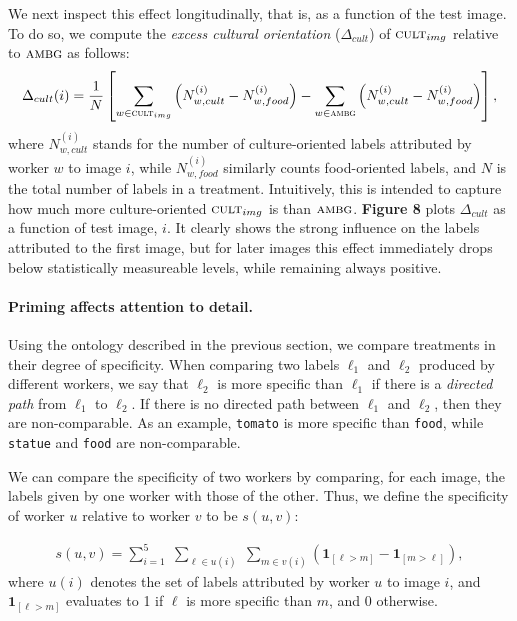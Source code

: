 \documentclass[a4paper]{report}
\begin{document}
We next inspect this effect longitudinally, that is, as a function of 
the test image.  To do so, we compute the \textit{excess cultural orientation} 
($\Delta_{cult}$) of
$\textsc{cult}_{img}$ relative to $\textsc{ambg}$ as follows: 
\begin{align}
	\Delta_{cult}(i) = \frac{1}{N}\left[ \sum_{w\in\textsc{cult}_{img}} \left(N_{w,cult}^{(i)} - N_{w,food}^{(i)}\right)
	- \sum_{w\in\textsc{ambg}} \left(N_{w,cult}^{(i)} - N_{w,food}^{(i)}\right)\right],
\end{align}
where $N_{w,cult}^{(i)}$ stands for the number of culture-oriented labels 
attributed by worker $w$ to image $i$, while $N_{w,food}^{(i)}$ similarly 
counts food-oriented labels, and $N$ is the total number of labels in a 
treatment.  
Intuitively, this is intended to capture how much 
more culture-oriented $\textsc{cult}_{img}$ is than $\textsc{ambg}$.  
\textbf{Figure 8} plots $\Delta_{cult}$ as a function of test image, $i$. It
clearly shows the strong influence on the labels attributed to the first image,
but for later images this effect immediately drops below statistically 
measureable levels, while remaining always positive.

\paragraph{Priming affects attention to detail.} Using the ontology described
in the previous section, we compare treatments in their degree of specificity.
When comparing two labels $\ell_1$ and $\ell_2$ produced by different workers,
we say that $\ell_2$ is more specific than $\ell_1$ if there is a 
\textit{directed path} from $\ell_1$ to $\ell_2$.  If there is no directed path
between $\ell_1$ and $\ell_2$, then they are non-comparable.  As an example,
\texttt{tomato} is more specific than \texttt{food}, while \texttt{statue}
and \texttt{food} are non-comparable.

We can compare the specificity of two workers by comparing, for each image,
the labels given by one worker with those of the other.  Thus, we define the
specificity of worker $u$ relative to worker $v$ to be $s(u,v)$:

\begin{align}
	s(u,v) = \sum_{i=1}^5 \;
	\sum_{\ell \in u(i) } \;
	\sum_{m \in v(i)} 
	\left(\mathbf{1}_{[\ell > m]} - \mathbf{1}_{[m>\ell]}\right),
	\label{eq:worker-specificity}
\end{align}
where $u(i)$ denotes the set of labels attributed by worker $u$ to image $i$, 
and $\mathbf{1}_{[\ell > m]}$ evaluates to 1 if $\ell$ is more specific than 
$m$, and 0 otherwise.
\end{document}
